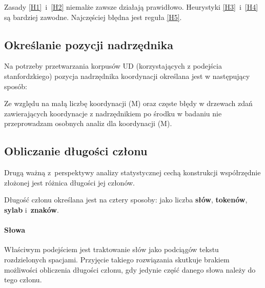 Zasady \ref{H1}~i~\ref{H2} niemalże zawsze działają prawidłowo. Heurystyki \ref{H3}~i~\ref{H4} są bardziej zawodne. Najczęściej błędna jest reguła \ref{H5}.

\subsection{Określanie pozycji nadrzędnika}

Na potrzeby przetwarzania korpusów UD (korzystających z podejścia stanfordzkiego) pozycja nadrzędnika koordynacji określana jest w następujący sposób:

\begin{table}[!h]
\end{table}

Ze względu na małą liczbę koordynacji (M) oraz częste błędy w drzewach zdań zawierających koordynacje z nadrzędnikiem po środku w badaniu nie przeprowadzam osobnych analiz dla koordynacji (M).

\subsection{Obliczanie długości członu}

Drugą ważną z~perspektywy analizy statystycznej cechą konstrukcji współrzędnie złożonej jest różnica długości jej członów.

Długość członu określana jest na cztery sposoby: jako liczba \textbf{słów}, \textbf{tokenów}, \textbf{sylab} i~\textbf{znaków}.

\paragraph{Słowa}
Właściwym podejściem jest traktowanie słów jako podciągów tekstu rozdzielonych spacjami. Przyjęcie takiego rozwiązania skutkuje brakiem możliwości obliczenia długości członu, gdy jedynie część danego słowa należy do tego członu.

